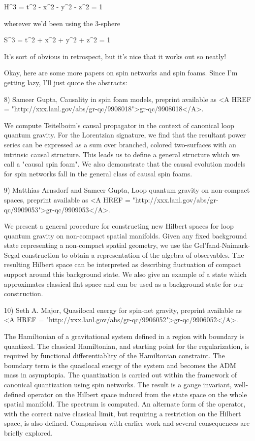 H^{3} = {t^{2} - x^{2} - y^{2} - z^{2} 
= 1}

wherever we'd been using the 3-sphere

S^{3} = {t^{2} + x^{2} + y^{2} + z^{2} 
= 1}

It's sort of obvious in retrospect, but it's nice that it works out so
neatly!  

Okay, here are some more papers on spin networks and spin foams.
Since I'm getting lazy, I'll just quote the abstracts:

8) Sameer Gupta, Causality in spin foam models, preprint available as
<A HREF = "http://xxx.lanl.gov/abs/gr-qc/9908018">gr-qc/9908018</A>.  

We compute Teitelboim's causal propagator in the context of canonical
loop quantum gravity. For the Lorentzian signature, we find that the
resultant power series can be expressed as a sum over branched, colored
two-surfaces with an intrinsic causal structure.  This leads us to
define a general structure which we call a "causal spin foam".  We also
demonstrate that the causal evolution models for spin networks fall in
the general class of causal spin foams.

9) Matthias Arnsdorf and Sameer Gupta, Loop quantum gravity on
non-compact spaces, preprint available as <A HREF = "http://xxx.lanl.gov/abs/gr-qc/9909053">gr-qc/9909053</A>. 

We present a general procedure for constructing new Hilbert spaces for
loop quantum gravity on non-compact spatial manifolds.  Given any fixed
background state representing a non-compact spatial geometry, we use the
Gel'fand-Naimark-Segal construction to obtain a representation of the
algebra of observables.  The resulting Hilbert space can be interpreted
as describing fluctuation of compact support around this background
state.  We also give an example of a state which approximates classical
flat space and can be used as a background state for our construction.

10) Seth A. Major, Quasilocal energy for spin-net gravity, preprint
available as <A HREF = "http://xxx.lanl.gov/abs/gr-qc/9906052">gr-qc/9906052</A>.  

The Hamiltonian of a gravitational system defined in a region with
boundary is quantized.  The classical Hamiltonian, and starting point for
the regularization, is required by functional differentiablity of the
Hamiltonian constraint.  The boundary term is the quasilocal energy of
the system and becomes the ADM mass in asymptopia.  The quantization is
carried out within the framework of canonical quantization using spin
networks.  The result is a gauge invariant, well-defined operator on the
Hilbert space induced from the state space on the whole spatial
manifold.  The spectrum is computed.  An alternate form of the operator,
with the correct naive classical limit, but requiring a restriction on
the Hilbert space, is also defined.  Comparison with earlier work and
several consequences are briefly explored.

